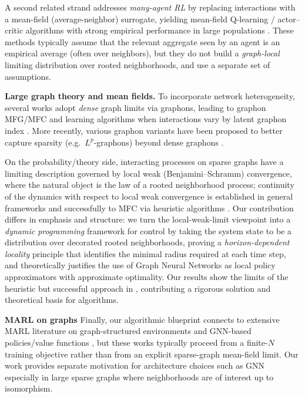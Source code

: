 \documentclass{article}
\begin{document}
A second related strand addresses \emph{many-agent RL} by replacing interactions with a mean-field (average-neighbor) surrogate, yielding mean-field Q-learning / actor--critic algorithms with strong empirical performance in large populations \cite{yang2018mean,gu2021mean}.
These methods typically assume that the relevant aggregate seen by an agent is an empirical average (often over neighbors), but they do not build a \emph{graph-local} limiting distribution over rooted neighborhoods, and use a separate set of assumptions.

\noindent\textbf{Large graph theory and mean fields.}
To incorporate network heterogeneity, several works adopt \emph{dense} graph limits via graphons, leading to graphon MFG/MFC and learning algorithms when interactions vary by latent graphon index \cite{cui2022learning,hu2023graphon,zhang2024learning,zhang2024learning2}.
More recently, various graphon variants have been proposed to better capture sparsity (e.g.\ $L^p$-graphons) beyond dense graphons \cite{fabian2023learning, fabian2024learning}.

On the probability/theory side, interacting processes on sparse graphs have a limiting description governed by local weak (Benjamini--Schramm) convergence, where the natural object is the law of a rooted neighborhood process; continuity of the dynamics with respect to local weak convergence is established in general frameworks \cite{lacker2023local} and successfully to MFC via heuristic algorithms \cite{fabian2025learning}.
Our contribution differs in emphasis and structure: we turn the local-weak-limit viewpoint into a \emph{dynamic programming} framework for control by taking the system state to be a distribution over decorated rooted neighborhoods, proving a \emph{horizon-dependent locality} principle that identifies the minimal radius required at each time step, and theoretically justifies the use of Graph Neural Networks as local policy approximators with approximate optimality. Our results show the limits of the heuristic but successful approach in \cite{fabian2025learning}, contributing a rigorous solution and theoretical basis for algorithms.

\noindent\textbf{MARL on graphs}
Finally, our algorithmic blueprint connects to extensive MARL literature on graph-structured environments and GNN-based policies/value functions \cite{Jiang2020Graph,sunehag2018value,rashid2020monotonic}, but these works typically proceed from a finite-$N$ training objective rather than from an explicit sparse-graph mean-field limit. Our work provides separate motivation for architecture choices such as GNN especially in large sparse graphs where neighborhoods are of interest up to isomorphism.
\end{document}
